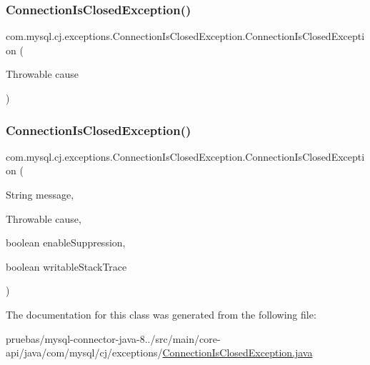 \subsubsection{\texorpdfstring{Connection\+Is\+Closed\+Exception()}{ConnectionIsClosedException()}\hspace{0.1cm}{\footnotesize\ttfamily [4/5]}}
{\footnotesize\ttfamily com.\+mysql.\+cj.\+exceptions.\+Connection\+Is\+Closed\+Exception.\+Connection\+Is\+Closed\+Exception (\begin{DoxyParamCaption}\item[{Throwable}]{cause }\end{DoxyParamCaption})}

\mbox{\label{classcom_1_1mysql_1_1cj_1_1exceptions_1_1_connection_is_closed_exception_a02e0a106b5dacc40096467a3ce9d1273}} 
\subsubsection{\texorpdfstring{Connection\+Is\+Closed\+Exception()}{ConnectionIsClosedException()}\hspace{0.1cm}{\footnotesize\ttfamily [5/5]}}
{\footnotesize\ttfamily com.\+mysql.\+cj.\+exceptions.\+Connection\+Is\+Closed\+Exception.\+Connection\+Is\+Closed\+Exception (\begin{DoxyParamCaption}\item[{String}]{message,  }\item[{Throwable}]{cause,  }\item[{boolean}]{enable\+Suppression,  }\item[{boolean}]{writable\+Stack\+Trace }\end{DoxyParamCaption})\hspace{0.3cm}{\ttfamily [protected]}}



The documentation for this class was generated from the following file\+:\begin{DoxyCompactItemize}
\item 
pruebas/mysql-\/connector-\/java-\/8../src/main/core-\/api/java/com/mysql/cj/exceptions/\mbox{\hyperlink{_connection_is_closed_exception_8java}{Connection\+Is\+Closed\+Exception.\+java}}\end{DoxyCompactItemize}
